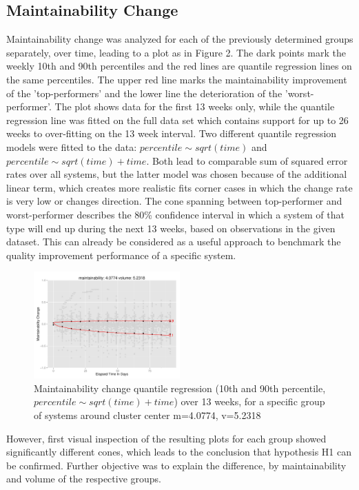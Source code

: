 \subsection{Maintainability Change}
Maintainability change was analyzed for each of the previously determined groups separately, over time, leading to a plot as in Figure 2. The dark points mark the weekly 10th and 90th percentiles and the red lines are quantile regression lines on the same percentiles. The upper red line marks the maintainability improvement of the 'top-performers' and the lower line the deterioration of the 'worst-performer'. The plot shows data for the first 13 weeks only, while the quantile regression line was fitted on the full data set which contains support for up to 26 weeks to over-fitting on the 13 week interval. Two different quantile regression models were fitted to the data: \(percentile\sim sqrt(time)\) and \(percentile\sim sqrt(time)+time\). Both lead to comparable sum of squared error rates over all systems, but the latter model was chosen because of the additional linear term, which creates more realistic fits corner cases in which the change rate is very low or changes direction. 
The cone spanning between top-performer and worst-performer describes the 80\% confidence interval in which a system of that type will end up during the next 13 weeks, based on observations in the given dataset. This can already be considered as a useful approach to benchmark the quality improvement performance of a specific system.
\begin{figure}[htbp!]
  \label{cone}
  \centering
  \includegraphics[width=0.5\textwidth]{figs/graph_m_4v_5.pdf}
  \caption{Maintainability change quantile regression (10th and 90th percentile, \(percentile\sim sqrt(time)+time\)) over 13 weeks, for a specific group of systems around cluster center m=4.0774, v=5.2318}
\end{figure}
However, first visual inspection of the resulting plots for each group showed significantly different cones, which leads to the conclusion that hypothesis H1 can be confirmed. Further objective was to explain the difference, by maintainability and volume of the respective groups. 
